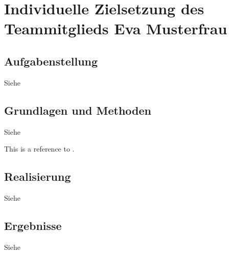 \section{Individuelle Zielsetzung des Teammitglieds Eva
Musterfrau}
\label{sec:student2main}


\subsection{Aufgabenstellung}

Siehe 

\subsection{Grundlagen und Methoden}

Siehe 

This is a reference to \cite{Nicosevici:2009eo}.

\subsection{Realisierung}

Siehe 

\subsection{Ergebnisse}

Siehe 

